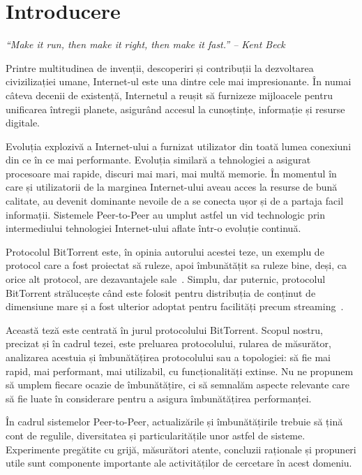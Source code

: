 
\chapter{Introducere}
\label{chapter:intro}

\textit{``Make it run, then make it right, then make it fast.'' -- Kent Beck}

Printre multitudinea de invenții, descoperiri și contribuții la dezvoltarea
civizilizației umane, Internet-ul este una dintre cele mai impresionante. În
numai câteva decenii de existență, Internetul a reușit să furnizeze mijloacele
pentru unificarea întregii planete, asigurând accesul la cunoștințe,
informație și resurse digitale.

Evoluția explozivă a Internet-ului a furnizat utilizator din toată lumea
conexiuni din ce în ce mai performante. Evoluția similară a tehnologiei a
asigurat procesoare mai rapide, discuri mai mari, mai multă memorie. În
momentul în care și utilizatorii de la marginea Internet-ului aveau acces la
resurse de bună calitate, au devenit dominante nevoile de a se conecta ușor și
de a partaja facil informații. Sistemele Peer-to-Peer au umplut astfel un vid
technologic prin intermediului tehnologiei Internet-ului aflate într-o
evoluție continuă.

Protocolul BitTorrent este, în opinia autorului acestei teze, un exemplu de
protocol care a fost proiectat să ruleze, apoi îmbunătățit sa ruleze bine,
deși, ca orice alt protocol, are dezavantajele
sale~\cite{bittorrent-trade-offs}. Simplu, dar puternic, protocolul BitTorrent
strălucește când este folosit pentru distribuția de conținut de dimensiune
mare și a fost ulterior adoptat pentru facilități precum
streaming~\cite{bittorrent-streaming}.

Această teză este centrată în jurul protocolului BitTorrent. Scopul nostru,
precizat și în cadrul tezei, este preluarea protocolului, rularea de
măsurător, analizarea acestuia și îmbunătățirea protocolului sau a topologiei:
să fie mai rapid, mai performant, mai utilizabil, cu funcționalități extinse.
Nu ne propunem să umplem fiecare ocazie de îmbunătățire, ci să semnalăm
aspecte relevante care să fie luate în considerare pentru a asigura
îmbunătățirea performanței.

În cadrul sistemelor Peer-to-Peer, actualizările și îmbunătățirile trebuie să
țină cont de regulile, diversitatea și particularitățile unor astfel de
sisteme. Experimente pregătite cu grijă, măsurători atente, concluzii
raționale și propuneri utile sunt componente importante ale activităților de
cercetare în acest domeniu.


